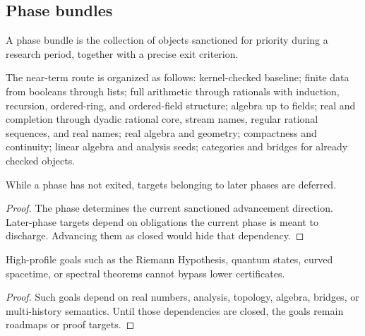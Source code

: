 \subsection{Phase bundles}
\label{subsec:philosophy-programme-phase-bundles}

\begin{definition}
\label{def:philosophy-programme-phase-bundle}
A phase bundle is the collection of objects sanctioned for priority
during a research period, together with a precise exit criterion.
\end{definition}

\begin{definition}
\label{def:philosophy-programme-near-term-phases}
The near-term route is organized as follows: kernel-checked baseline;
finite data from booleans through lists; full arithmetic through
rationals with induction, recursion, ordered-ring, and ordered-field
structure; algebra up to fields; real and completion through dyadic
rational core, stream names, regular rational sequences, and real
names; real algebra and geometry; compactness and continuity; linear
algebra and analysis seeds; categories and bridges for already checked
objects.
\end{definition}

\begin{theorem}
\label{thm:philosophy-programme-no-phase-skipping}
While a phase has not exited, targets belonging to later phases are
deferred.
\end{theorem}
\begin{proof}
The phase determines the current sanctioned advancement direction.
Later-phase targets depend on obligations the current phase is meant
to discharge. Advancing them as closed would hide that dependency.
\end{proof}

\begin{corollary}
\label{cor:philosophy-programme-dependency-before-attraction}
High-profile goals such as the Riemann Hypothesis, quantum states,
curved spacetime, or spectral theorems cannot bypass lower certificates.
\end{corollary}
\begin{proof}
Such goals depend on real numbers, analysis, topology, algebra,
bridges, or multi-history semantics. Until those dependencies are
closed, the goals remain roadmaps or proof targets.
\end{proof}

